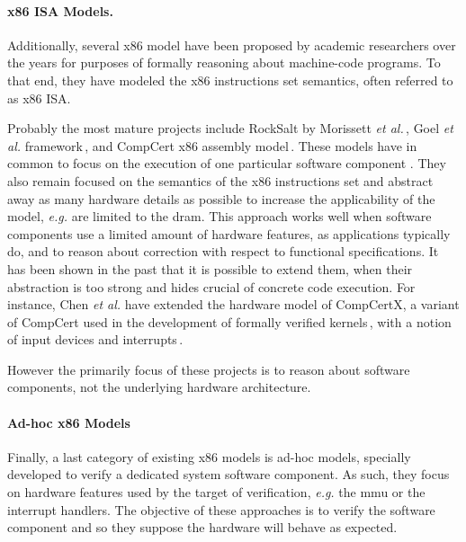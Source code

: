 \paragraph{x86 ISA Models.}
%
Additionally, several x86 model have been proposed by academic researchers over
the years for purposes of formally reasoning about machine-code programs.
%
To that end, they have modeled the x86 instructions set semantics, often
referred to as x86 ISA.

Probably the most mature projects include RockSalt by Morissett \emph{et
  al.}\,\cite{morrisett2012rocksalt}, Goel \emph{et al.}
framework\,\cite{goel2014x86}, and CompCert x86 assembly
model\,\cite{leroy2012compcert}.
%
These models have in common to focus on the execution of one particular software
component . They also remain focused on the semantics of the x86 instructions set and
abstract away as many hardware details as possible to increase the applicability
of the model, \emph{e.g.} are limited to the \ac{dram}.
%
This approach works well when software components use a limited amount of
hardware features, as applications typically do, and to reason about correction
with respect to functional specifications.
%
It has been shown in the past that it is possible to extend them, when their
abstraction is too strong and hides crucial  of concrete code execution.
%
For instance, Chen \emph{et al.} have extended the hardware model of CompCertX,
a variant of CompCert used in the development of formally verified
kernels\,\cite{gu2016certikos}, with a notion of input devices and
interrupts\,\cite{chen2018interrupt}.

However  the primarily focus of these projects is to reason about software components, not the underlying hardware
architecture.

\paragraph{Ad-hoc x86 Models}
%
Finally, a last category of existing x86 models is ad-hoc models, specially developed to verify a dedicated system software component.
%
As such, they focus on hardware features used by the target of verification, \emph{e.g.} the \ac{mmu} or the interrupt handlers. The objective of these approaches is to verify the software component and so they suppose the hardware will behave as expected. 

